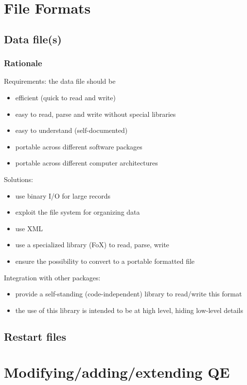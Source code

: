 \documentclass[12pt,a4paper]{article}
\def\qe{QE}
\begin{document}
\section{File Formats}

\subsection{Data file(s)}

\subsubsection{Rationale}

Requirements: the data file should be
\begin{itemize}
\item efficient (quick to read and write)
\item easy to read, parse and write without special libraries
\item easy to understand (self-documented)
\item portable across different software packages
\item portable across different computer architectures
\end{itemize}
Solutions:
\begin{itemize}
\item use binary I/O for large records
\item exploit the file system for organizing data
\item use XML
\item use a specialized library (FoX) to read, parse, write
\item ensure the possibility to convert to a portable formatted file
\end{itemize}
Integration with other packages:
\begin{itemize}
\item provide a self-standing (code-independent) library to read/write this format
\item the use of this library is intended to be at high level, hiding low-level details
\end{itemize}


\subsection{Restart files}

\section{Modifying/adding/extending \qe}
\end{document}

